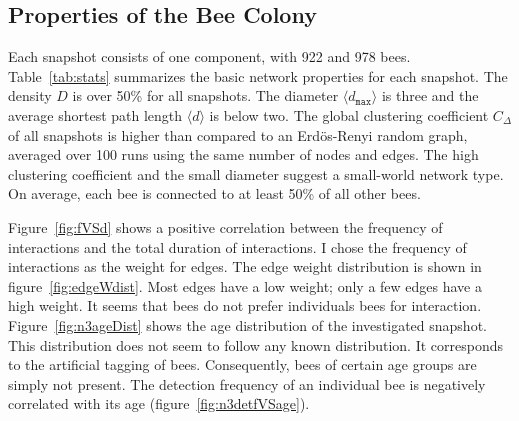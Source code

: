 \subsection{Properties of the Bee Colony}
\label{subsec:colony}
Each snapshot consists of one component, with 922 and 978 bees.
Table~\ref{tab:stats} summarizes the basic network properties for each snapshot.
The density $D$ is over 50\% for all snapshots.
The diameter $\langle d_{\texttt{max}} \rangle$ is three and the average shortest path length $\langle d \rangle$ is below two.
The global clustering coefficient $C_\Delta$ of all snapshots is higher than compared to an Erdös-Renyi random graph, averaged over 100 runs using the same number of nodes and edges.
The high clustering coefficient and the small diameter suggest a small-world network type.
On average, each bee is connected to at least 50\% of all other bees.

Figure~\ref{fig:fVSd} shows a positive correlation between the frequency of interactions and the total duration of interactions.
I chose the frequency of interactions as the weight for edges.
The edge weight distribution is shown in figure~\ref{fig:edgeWdist}.
Most edges have a low weight; only a few edges have a high weight.
It seems that bees do not prefer individuals bees for interaction.
Figure~\ref{fig:n3ageDist} shows the age distribution of the investigated snapshot. This distribution does not seem to follow any known distribution. It corresponds to the artificial tagging of bees. Consequently, bees of certain age groups are simply not present. The detection frequency of an individual bee is negatively correlated with its age (figure~\ref{fig:n3detfVSage}).




